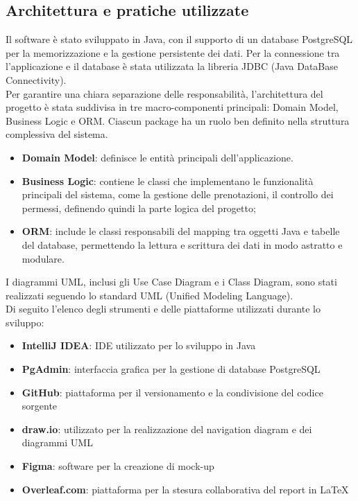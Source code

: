 \subsection{Architettura e pratiche utilizzate}
Il software è stato sviluppato in Java, con il supporto di un database PostgreSQL per la memorizzazione e la gestione persistente dei dati. Per la connessione tra l’applicazione e il database è stata utilizzata la libreria JDBC (Java DataBase Connectivity).\\
\noindent
Per garantire una chiara separazione delle responsabilità, l’architettura del progetto è stata suddivisa in tre macro-componenti principali: Domain Model, Business Logic e ORM. Ciascun package ha un ruolo ben definito nella struttura complessiva del sistema.
\begin{itemize}
\item \textbf{Domain Model}: definisce le entità principali dell’applicazione.
\item \textbf{Business Logic}: contiene le classi che implementano le funzionalità principali del sistema, come la gestione delle prenotazioni, il controllo dei permessi, definendo quindi la parte logica del progetto;
\item \textbf{ORM}: include le classi responsabili del mapping tra oggetti Java e tabelle del database, permettendo la lettura e scrittura dei dati in modo astratto e modulare.
\end{itemize}
I diagrammi UML, inclusi gli Use Case Diagram e i Class Diagram, sono stati realizzati seguendo lo standard UML (Unified Modeling Language).\\
\noindent Di seguito l’elenco degli strumenti e delle piattaforme utilizzati durante lo sviluppo:
\begin{itemize}
\item \textbf{IntelliJ IDEA}: IDE utilizzato per lo sviluppo in Java
\item \textbf{PgAdmin}: interfaccia grafica per la gestione di database PostgreSQL
\item \textbf{GitHub}: piattaforma per il versionamento e la condivisione del codice sorgente
\item \textbf{draw.io}: utilizzato per la realizzazione del navigation diagram e dei diagrammi UML
\item \textbf{Figma}: software per la creazione di mock-up
\item \textbf{Overleaf.com}: piattaforma per la stesura collaborativa del report in \LaTeX
\end{itemize}
\newpage